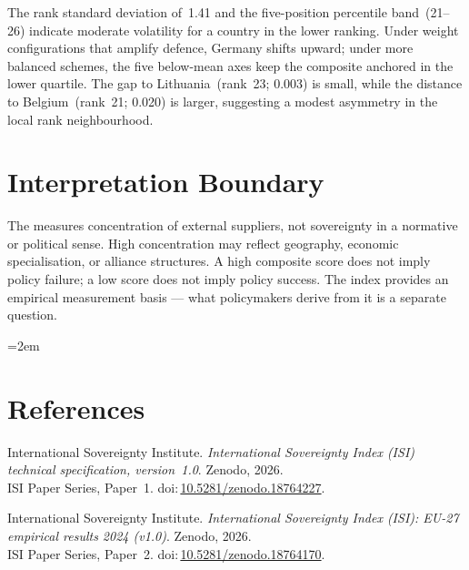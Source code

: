 \documentclass[12pt,a4paper]{article}
\begin{document}
The rank standard deviation of~1.41 and the five-position percentile band~(21--26) indicate moderate volatility for a country in the lower ranking.  Under weight configurations that amplify defence, Germany shifts upward; under more balanced schemes, the five below-mean axes keep the composite anchored in the lower quartile.  The gap to Lithuania~(rank~23; 0.003) is small, while the distance to Belgium~(rank~21; 0.020) is larger, suggesting a modest asymmetry in the local rank neighbourhood.


\section{Interpretation Boundary}
\label{sec:interpretation}

The \ISI measures concentration of external suppliers, not sovereignty in a normative or political sense.  High concentration may reflect geography, economic specialisation, or alliance structures.  A high composite score does not imply policy failure; a low score does not imply policy success.  The index provides an empirical measurement basis --- what policymakers derive from it is a separate question.


\clearpage
\vspace*{1.5cm}

\begingroup\emergencystretch=2em
\section*{References}

\begin{enumerate}[label={[\arabic*]},leftmargin=2em,itemsep=6pt]
\item International Sovereignty Institute.
  \textit{International Sovereignty Index (ISI) technical specification, version~1.0}.
  Zenodo, 2026.\\ISI Paper Series, Paper~1.
  doi:\,\href{https://doi.org/10.5281/zenodo.18764227}{10.5281/zenodo.18764227}.

\item International Sovereignty Institute.
  \textit{International Sovereignty Index (ISI): EU-27 empirical results 2024 (v1.0)}.
  Zenodo, 2026.\\ISI Paper Series, Paper~2.
  doi:\,\href{https://doi.org/10.5281/zenodo.18764170}{10.5281/zenodo.18764170}.
\end{enumerate}
\endgroup
\end{document}
